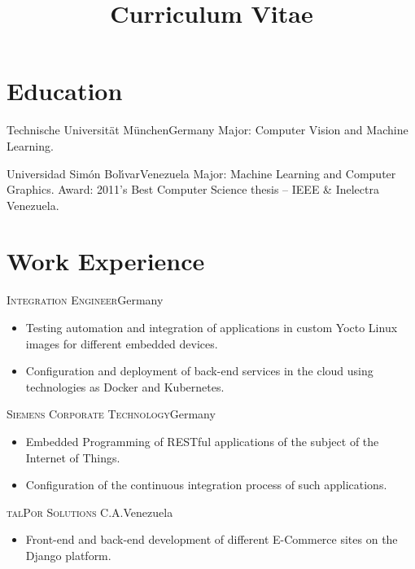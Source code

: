 \documentclass[10pt]{moderncv}
\title{Curriculum Vitae}
\begin{document}
\maketitle

\section{Education}

  {Technische Universit\"at M\"unchen}{Germany}{}{%
    Major: Computer Vision and Machine Learning.
  }

  {Universidad Sim\'on Bol\'{\i}var}{Venezuela}{}{%
    Major: Machine Learning and Computer Graphics.
    \newline
    Award: 2011's Best Computer Science thesis -- IEEE \& Inelectra Venezuela.
  }

\section{Work Experience}

{\textsc{Integration Engineer}}{Germany}{}{%
\begin{itemize}
    \item Testing automation and integration of applications in custom Yocto 
      Linux images for different embedded devices.
    \item Configuration and deployment of back-end services in the cloud using 
      technologies as Docker and Kubernetes.
\end{itemize}
}

{\textsc{Siemens Corporate Technology}}{Germany}{}{%
\begin{itemize}
  \item Embedded Programming of RESTful applications of the subject of the 
    Internet of Things.
  \item Configuration of the continuous integration process of such 
    applications.
\end{itemize}
}

{\textsc{talPor Solutions C.A.}}{Venezuela}{}{%
\begin{itemize}
  \item Front-end and back-end development of different E-Commerce sites
    on the Django platform.
\end{itemize}
}
\end{document}

